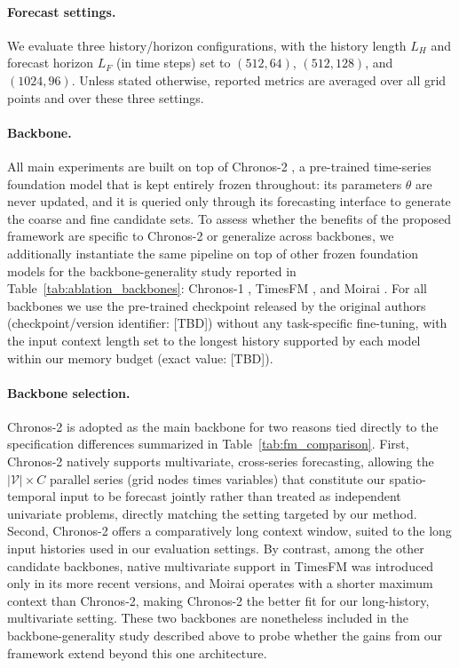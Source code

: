 \documentclass[preprint,12pt]{elsarticle}
\begin{document}
\paragraph{Forecast settings.} We evaluate three history/horizon configurations, with the history length $L_H$ and forecast horizon $L_F$ (in time steps) set to $(512, 64)$, $(512, 128)$, and $(1024, 96)$. Unless stated otherwise, reported metrics are averaged over all grid points and over these three settings.

\paragraph{Backbone.} All main experiments are built on top of Chronos-2 \citep{ansari2025chronos2}, a pre-trained time-series foundation model that is kept entirely frozen throughout: its parameters $\theta$ are never updated, and it is queried only through its forecasting interface to generate the coarse and fine candidate sets. To assess whether the benefits of the proposed framework are specific to Chronos-2 or generalize across backbones, we additionally instantiate the same pipeline on top of other frozen foundation models for the backbone-generality study reported in Table~\ref{tab:ablation_backbones}: Chronos-1 \citep{ansari2024chronos}, TimesFM \citep{das2024timesfm}, and Moirai \citep{woo2024moirai}. For all backbones we use the pre-trained checkpoint released by the original authors (checkpoint/version identifier: [TBD]) without any task-specific fine-tuning, with the input context length set to the longest history supported by each model within our memory budget (exact value: [TBD]).

\paragraph{Backbone selection.} Chronos-2 is adopted as the main backbone for two reasons tied directly to the specification differences summarized in Table~\ref{tab:fm_comparison}. First, Chronos-2 natively supports multivariate, cross-series forecasting, allowing the $|\mathcal{V}| \times C$ parallel series (grid nodes times variables) that constitute our spatio-temporal input to be forecast jointly rather than treated as independent univariate problems, directly matching the setting targeted by our method. Second, Chronos-2 offers a comparatively long context window, suited to the long input histories used in our evaluation settings. By contrast, among the other candidate backbones, native multivariate support in TimesFM \citep{das2024timesfm} was introduced only in its more recent versions, and Moirai \citep{woo2024moirai} operates with a shorter maximum context than Chronos-2, making Chronos-2 the better fit for our long-history, multivariate setting. These two backbones are nonetheless included in the backbone-generality study described above to probe whether the gains from our framework extend beyond this one architecture.
\end{document}
